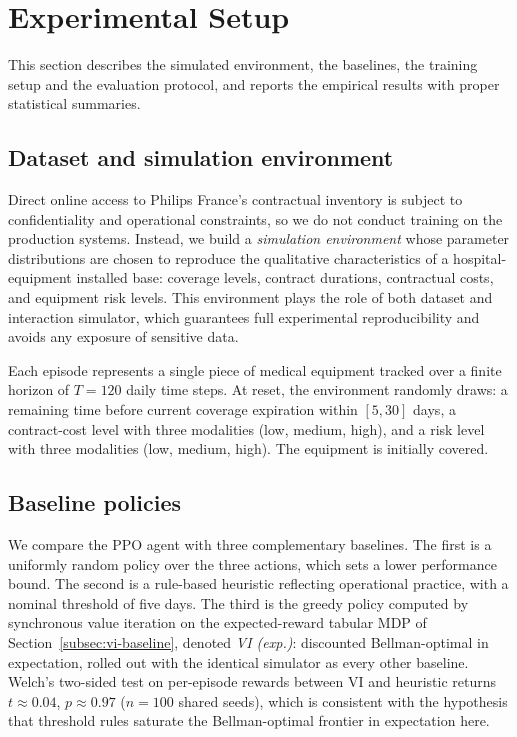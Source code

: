 \section{Experimental Setup}
\label{sec:experiments}

This section describes the simulated environment, the baselines, the training setup and the evaluation protocol, and reports the empirical results with proper statistical summaries.


\subsection{Dataset and simulation environment}
\label{subsec:dataset}

Direct online access to Philips France's contractual inventory is subject to confidentiality and operational constraints, so we do not conduct training on the production systems. Instead, we build a \emph{simulation environment} whose parameter distributions are chosen to reproduce the qualitative characteristics of a hospital-equipment installed base: coverage levels, contract durations, contractual costs, and equipment risk levels. This environment plays the role of both dataset and interaction simulator, which guarantees full experimental reproducibility and avoids any exposure of sensitive data.

Each episode represents a single piece of medical equipment tracked over a finite horizon of $T = 120$ daily time steps. At reset, the environment randomly draws: a remaining time before current coverage expiration within $[5, 30]$ days, a contract-cost level with three modalities (low, medium, high), and a risk level with three modalities (low, medium, high). The equipment is initially covered.


\subsection{Baseline policies}
\label{subsec:baselines}

We compare the PPO agent with three complementary baselines. The first is a uniformly random policy over the three actions, which sets a lower performance bound. The second is a rule-based heuristic reflecting operational practice, with a nominal threshold of five days. The third is the greedy policy computed by synchronous value iteration on the expected-reward tabular MDP of Section~\ref{subsec:vi-baseline}, denoted \emph{VI (exp.)}: discounted Bellman-optimal in expectation, rolled out with the identical simulator as every other baseline. Welch's two-sided test on per-episode rewards between VI and heuristic returns $t \approx 0.04$, $p \approx 0.97$ ($n{=}100$ shared seeds), which is consistent with the hypothesis that threshold rules saturate the Bellman-optimal frontier in expectation here.


